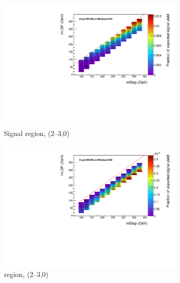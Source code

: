 \begin{figure}[ht!]
  \centering
  \begin{subfigure}[b]{0.47\textwidth}
    \includegraphics[width=\textwidth]{Figs/sms/t2degen/v23/effs/T2_4body_had_eff_maps_eq0b_le3j_SITV.pdf}
    \caption{Signal region, (2--3,0)}
    \label{fig:t2_4body_sig_eff_le3j_0b}
  \end{subfigure}
  \begin{subfigure}[b]{0.47\textwidth}
    \includegraphics[width=\textwidth]{Figs/sms/t2degen/v23/effs/T2_4body_muon_eff_maps_eq0b_le3j_SITV.pdf}
    \caption{\mj region, (2--3,0)}
    \label{fig:t2_4body_mu_eff_le3j_0b}
  \end{subfigure} \\
  \begin{subfigure}[b]{0.47\textwidth}

\end{subfigure}
\end{figure}
